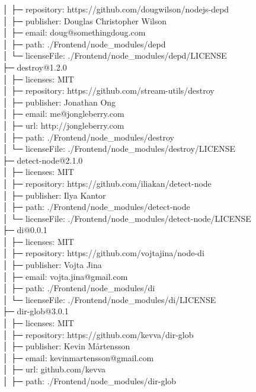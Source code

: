 │  ├─ repository: https://github.com/dougwilson/nodejs-depd\\
│  ├─ publisher: Douglas Christopher Wilson\\
│  ├─ email: doug@somethingdoug.com\\
│  ├─ path: ./Frontend/node\_modules/depd\\
│  └─ licenseFile: ./Frontend/node\_modules/depd/LICENSE\\
├─ destroy@1.2.0\\
│  ├─ licenses: MIT\\
│  ├─ repository: https://github.com/stream-utils/destroy\\
│  ├─ publisher: Jonathan Ong\\
│  ├─ email: me@jongleberry.com\\
│  ├─ url: http://jongleberry.com\\
│  ├─ path: ./Frontend/node\_modules/destroy\\
│  └─ licenseFile: ./Frontend/node\_modules/destroy/LICENSE\\
├─ detect-node@2.1.0\\
│  ├─ licenses: MIT\\
│  ├─ repository: https://github.com/iliakan/detect-node\\
│  ├─ publisher: Ilya Kantor\\
│  ├─ path: ./Frontend/node\_modules/detect-node\\
│  └─ licenseFile: ./Frontend/node\_modules/detect-node/LICENSE\\
├─ di@0.0.1\\
│  ├─ licenses: MIT\\
│  ├─ repository: https://github.com/vojtajina/node-di\\
│  ├─ publisher: Vojta Jina\\
│  ├─ email: vojta.jina@gmail.com\\
│  ├─ path: ./Frontend/node\_modules/di\\
│  └─ licenseFile: ./Frontend/node\_modules/di/LICENSE\\
├─ dir-glob@3.0.1\\
│  ├─ licenses: MIT\\
│  ├─ repository: https://github.com/kevva/dir-glob\\
│  ├─ publisher: Kevin Mårtensson\\
│  ├─ email: kevinmartensson@gmail.com\\
│  ├─ url: github.com/kevva\\
│  ├─ path: ./Frontend/node\_modules/dir-glob\\
